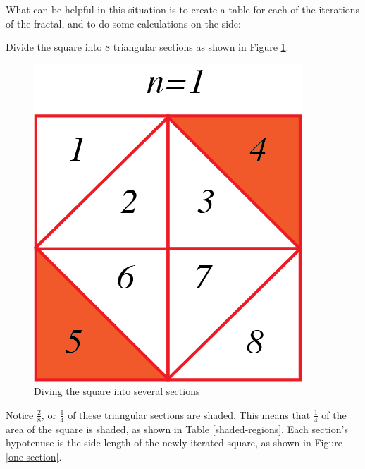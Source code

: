 \documentclass{article}
\begin{document}
    \begin{solns}
        What can be helpful in this situation is to create a table for each of the iterations of the fractal, and to do some calculations on the side:\par
        \vspace{0.5cm}
            Divide the square into 8 triangular sections as shown in Figure \ref{square-n-1}.
            \begin{figure}[H]
                \centering
                \includegraphics{Images/square-n-1.png}
                \caption{Diving the square into several sections}
                \label{square-n-1}
            \end{figure}
            Notice $\frac{2}{8}$, or $\frac{1}{4}$ of these triangular sections are shaded. This means that $\frac{1}{4}$ of the area of the square is shaded, as shown in Table \ref{shaded-regions}.
            Each section's hypotenuse is the side length of the newly iterated square, as shown in Figure \ref{one-section}.
            \begin{figure}[H]
                \centering

\end{figure}
\end{solns}
\end{document}

